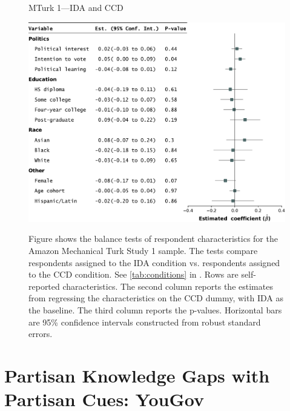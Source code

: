 \begin{center}
	\begin{figure}
		\centering
		\caption{MTurk 1---IDA and CCD}
		\includegraphics[width=\textwidth]{../figs/study1-baltest-24k-ips.pdf}
		\label{fig:baltest-24k-ips}
		\caption*{\footnotesize 
			Figure shows the balance tests of respondent characteristics for the Amazon Mechanical Turk Study 1 sample.
			The tests compare respondents assigned to the IDA condition vs. respondents assigned to the CCD condition.
			See \cref{tab:conditions} in .
			Rows are self-reported characteristics.
			The second column reports the estimates from regressing the characteristics on the CCD dummy, with IDA as the baseline.
			The third column reports the p-values.
			Horizontal bars are 95\% confidence intervals constructed from robust standard errors.
		}
	\end{figure}
\end{center}

\section{Partisan Knowledge Gaps with Partisan Cues: YouGov}

